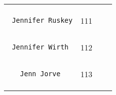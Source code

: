\documentclass[]{article}
\begin{document}
\begin{longtable}[c]{@{}llll@{}}
\begin{minipage}[t]{0.13\columnwidth}
\end{minipage} & \begin{minipage}[t]{0.15\columnwidth}\raggedright
\end{minipage}
\\\noalign{\medskip}
\begin{minipage}[t]{0.39\columnwidth}\raggedright
\begin{verbatim}
 Jennifer Ruskey
\end{verbatim}
\end{minipage} & \begin{minipage}[t]{0.10\columnwidth}\raggedright
111
\end{minipage} & \begin{minipage}[t]{0.13\columnwidth}\raggedright
\end{minipage} & \begin{minipage}[t]{0.15\columnwidth}\raggedright
\end{minipage}
\\\noalign{\medskip}
\begin{minipage}[t]{0.39\columnwidth}\raggedright
\begin{verbatim}
 Jennifer Wirth
\end{verbatim}
\end{minipage} & \begin{minipage}[t]{0.10\columnwidth}\raggedright
112
\end{minipage} & \begin{minipage}[t]{0.13\columnwidth}\raggedright
\end{minipage} & \begin{minipage}[t]{0.15\columnwidth}\raggedright
\end{minipage}
\\\noalign{\medskip}
\begin{minipage}[t]{0.39\columnwidth}\raggedright
\begin{verbatim}
   Jenn Jorve
\end{verbatim}
\end{minipage} & \begin{minipage}[t]{0.10\columnwidth}\raggedright
113
\end{minipage} & \begin{minipage}[t]{0.13\columnwidth}\raggedright
\end{minipage} & \begin{minipage}[t]{0.15\columnwidth}\raggedright
\end{minipage}
\\\noalign{\medskip}
\begin{minipage}[t]{0.39\columnwidth}\raggedright

\end{minipage}
\end{longtable}
\end{document}
